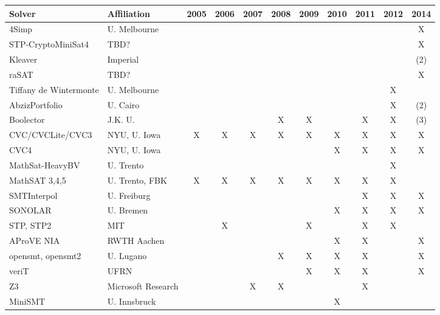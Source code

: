 \documentclass[twosize,11pt]{article}
\begin{document}
\begin{table}[t]
\centering
\begin{tabular}{|l|l|c|c|c|c|c|c|c|c|c|}
\hline
Solver & Affiliation & 2005 & 2006 & 2007 & 2008 & 2009 & 2010 & 2011 & 2012 & 2014 \\
\hline

4Simp                  & U. Melbourne 	&   &   &   &   &   &   &   &   & X  \\							
STP-CryptoMiniSat4     & TBD?           &   &   &   &   &   &   &   &   & X\\								
Kleaver	               & Imperial       &   &   &   &   &   &   &   &   & (2) \\								
raSAT  	               & TBD?           &   &   &   &   &   &   &   &   & X \\								
Tiffany de Wintermonte & U. Melbourne 	&   &   &   &   &   &   &   & X &  \\							
AbzizPortfolio         & U. Cairo       &   &   &   &   &   &   &   & X & (2)\\							
Boolector              & J.K. U.        &   &   &   & X & X &   & X & X & (3)\\
CVC/CVCLite/CVC3       & NYU, U. Iowa   & X & X & X & X & X & X & X & X & X \\
CVC4	                 & NYU, U. Iowa   &   &   &   &   &   & X & X & X & X \\
MathSat-HeavyBV        & U. Trento      &   &   &   &   &   &   &   & X &   \\								
MathSAT 3,4,5          & U. Trento, FBK & X & X & X & X & X & X & X & X &   \\
SMTInterpol            & U. Freiburg    &   &   &   &   &   &   & X & X & X \\
SONOLAR                & U. Bremen      &   &   &   &   &   & X & X & X & X \\
STP, STP2              & MIT            &   & X &   &   & X &   & X & X &   \\
AProVE NIA             & RWTH Aachen    &   &   &   &   &   & X & X &   & X \\
opensmt, opensmt2      & U. Lugano      &   &   &   & X & X & X & X &   & X \\
veriT                  & UFRN           &   &   &   &   & X & X & X &   & X \\
Z3                & Microsoft Research  &   &   & X & X &   &   & X &   &   \\
MiniSMT                & U. Innsbruck   &   &   &   &   &   & X &   &   &   \\	

\end{tabular}
\end{table}
\end{document}
